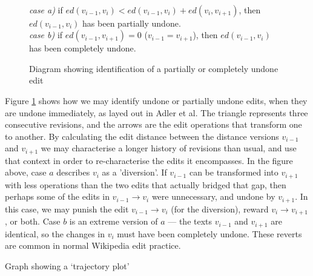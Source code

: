 \begin{figure}[h]
  \centering
  \\
  \textit{case a)} if $ed(v_{i-1},v_i) < ed(v_{i-1},v_i) +
  ed(v_{i},v_{i+1})$, then $ed(v_{i-1},v_i)$ has been
  partially undone.\\ 
  \textit{case b)} if $ed(v_{i-1},v_{i+1}) = 0$
  ($v_{i-1} = v_{i+1}$), then $ed(v_{i-1},v_i)$ has been
  completely undone.
  \caption{Diagram showing identification of a partially or
    completely undone edit}
  \label{fig:undo}
\end{figure}

Figure \ref{fig:undo} shows how we may identify undone or partially
undone edits, when they are undone immediately, as layed out in Adler
et al.\cite{Adler2007} The triangle represents three consecutive
revisions, and the arrows are the edit operations that transform one
to another. By calculating the edit distance between the distance
versions $v_{i-1}$ and $v_{i+1}$ we may characterise a longer history
of revisions than usual, and use that context in order to
re-characterise the edits it encompasses. In the figure above, case
$a$ describes $v_i$ as a 'diversion'. If $v_{i-1}$ can be transformed
into $v_{i+1}$ with less operations than the two edits that actually
bridged that gap, then perhaps some of the edits in $v_{i-1}
\rightarrow v_i$ were unnecessary, and undone by $v_{i+1}$. In this
case, we may punish the edit $v_{i-1} \rightarrow v_i$ (for the
diversion), reward $v_{i} \rightarrow v_{i+1}$, or both. Case $b$ is
an extreme version of $a$ --- the texts $v_{i-1}$ and $v_{i+1}$ are
identical, so the changes in $v_i$ must have been completely
undone. These reverts are common in normal Wikipedia edit
practice.\cite{wiki-revert}

\begin{floatingfigure}[p]{0.4\textwidth}
  \centering
  \pgfplotsset{width=0.4\textwidth}
  \caption{Graph showing a `trajectory plot'}
  \label{fig:dummy-history}
\end{floatingfigure}

